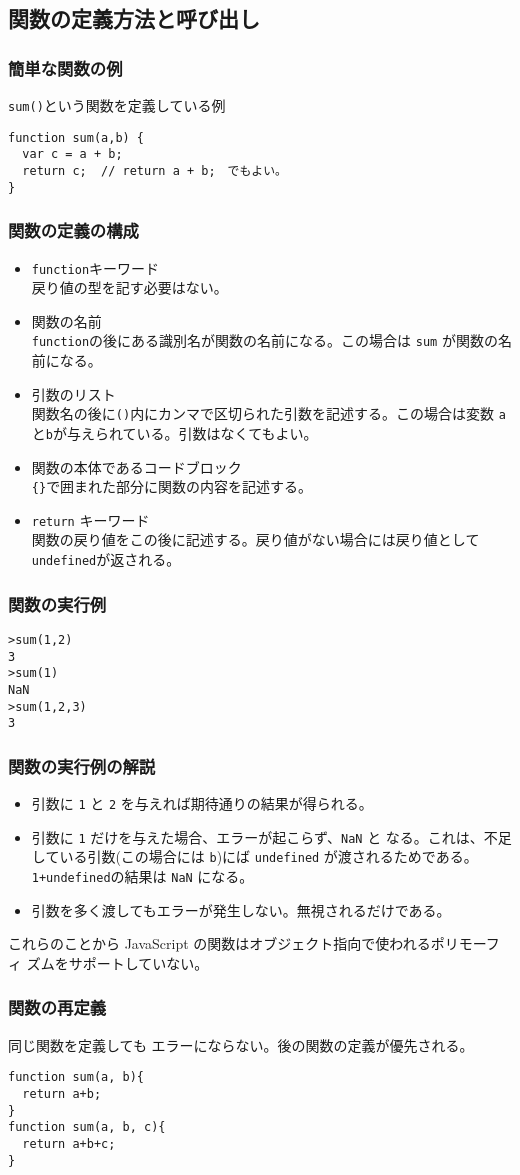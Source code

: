 \subsection{関数の定義方法と呼び出し}
\begin{frame}[containsverbatim]
\frametitle{簡単な関数の例}
\Verb+sum()+という関数を定義している例
\begin{Verbatim}
function sum(a,b) {
  var c = a + b;
  return c;  // return a + b;　でもよい。
}
\end{Verbatim}
\end{frame}
\begin{frame}[containsverbatim]
\frametitle{関数の定義の構成}
\begin{itemize}
 \item \Verb+function+キーワード\\
戻り値の型を記す必要はない。
 \item 関数の名前\\
\Verb+function+の後にある識別名が関数の名前になる。この場合は \Verb+sum+
       が関数の名前になる。
 \item 引数のリスト\\
関数名の後に\Verb+()+内にカンマで区切られた引数を記述する。この場合は変数
       \Verb+a+と\Verb+b+が与えられている。引数はなくてもよい。
 \item 関数の本体であるコードブロック\\
\Verb+{}+で囲まれた部分に関数の内容を記述する。
\item \Verb+return+ キーワード\\
関数の戻り値をこの後に記述する。戻り値がない場合には戻り値として
       \Verb+undefined+が返される。
\end{itemize}
\end{frame}
\begin{frame}[containsverbatim]
\frametitle{関数の実行例}
\begin{Verbatim}
>sum(1,2)
3
>sum(1)
NaN
>sum(1,2,3)
3
\end{Verbatim} 
\end{frame}
\begin{frame}[containsverbatim]
\frametitle{関数の実行例の解説}
\begin{itemize}
 \item 引数に \Verb+1+ と \Verb+2+ を与えれば期待通りの結果が得られる。
 \item 引数に \Verb+1+ だけを与えた場合、エラーが起こらず、\Verb+NaN+ と
       なる。これは、不足している引数(この場合には \Verb+b+)にば
       \Verb+undefined+ が渡されるためである。\Verb-1+undefined-の結果は
       \Verb+NaN+ になる。
 \item 引数を多く渡してもエラーが発生しない。無視されるだけである。
\end{itemize}
これらのことから JavaScript の関数はオブジェクト指向で使われるポリモーフィ
ズムをサポートしていない。
\end{frame}
\begin{frame}[containsverbatim]
\frametitle{関数の再定義}
同じ関数を定義しても
エラーにならない。後の関数の定義が優先される。
\begin{Verbatim}
function sum(a, b){
  return a+b;
}
function sum(a, b, c){
  return a+b+c;
}
\end{Verbatim}
\end{frame}
